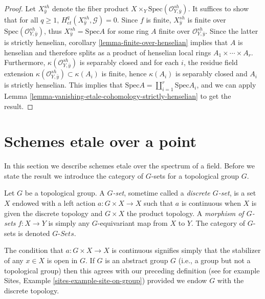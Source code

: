 \begin{proof}
Let $X_{\bar y}^{sh}$ denote the fiber product $X\times_Y
\text{Spec}(\mathcal{O}_{Y, \bar y}^{sh})$. It suffices to show that for
all $q\geq 1$, $H_{et}^q(X_{\bar y}^{sh}, \mathcal{G})=0$. Since $f$ is
finite, $X_{\bar y}^{sh}$ is finite over $\text{Spec}(\mathcal{O}_{Y, \bar
y}^{sh})$, thus $X_{\bar y}^{sh} = \text{Spec} A$ for some ring $A$
finite over $\mathcal{O}_{Y, \bar y}^{sh}$. Since the latter is strictly
henselian, corollary \ref{lemma-finite-over-henselian} implies that $A$
is henselian and therefore splits as a product of henselian local rings $A_1
\times \cdots \times A_r$. Furthermore, $\kappa(\mathcal{O}_{Y, \bar
y}^{sh})$ is separably closed and for each $i$, the residue field
extension $\kappa(\mathcal{O}_{Y, \bar y}^{sh}) \subset \kappa(A_i)$ is
finite, hence $\kappa(A_i)$ is separably closed and $A_i$ is strictly
henselian. This implies that $\text{Spec} A = \coprod_{i=1}^r \text{Spec} A_i$,
and we can apply
Lemma \ref{lemma-vanishing-etale-cohomology-strictly-henselian} to get
the result.
\end{proof}





\section{Schemes etale over a point}
\label{section-schemes-etale-point}

\noindent
In this section we describe schemes etale over the spectrum of
a field. Before we state the result we introduce
the category of $G$-sets for a topological group $G$.

\begin{definition}
\label{definition-G-set-continuous}
Let $G$ be a topological group.
A {\it $G$-set}, sometime called a {\it discrete $G$-set},
is a set $X$ endowed with a left action $a : G \times X \to X$
such that $a$ is continuous when $X$ is given the discrete topology and
$G \times X$ the product topology.
A {\it morphism of $G$-sets} $f : X \to Y$ is simply any $G$-equivariant
map from $X$ to $Y$.
The category of $G$-sets is denoted {\it $G\textit{-Sets}$}.
\end{definition}

\noindent
The condition that $a : G \times X \to X$ is continuous signifies
simply that the stabilizer of any  $x \in X$ is open in $G$.
If $G$ is an abstract group $G$ (i.e., a group but not a topological group)
then this agrees with our preceding definition (see for example
Sites, Example \ref{sites-example-site-on-group})
provided we endow $G$ with the discrete topology.

